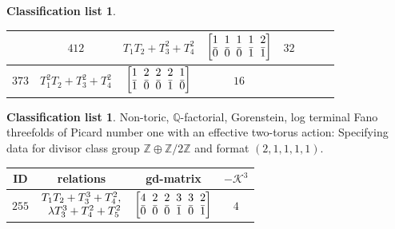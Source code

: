 \documentclass[pdftex]{sigma}%
\theoremstyle{definition}
\newtheorem{class-list}[thm]{Classification list}
\def\ZZ{{\mathbb Z}}
\def\QQ{{\mathbb Q}}
\numberwithin{equation}{section}
\begin{document}
\begin{class-list}
\begin{table}[h!]
\begin{tabu}{c|c|c|c||c|c|c|c}
&${412}$&${T_{1}T_{2}+T_{3}^{2}+T_{4}^{2}}$
&$\arraycolsep=1mm\begin{bmatrix}{1} & {1} & {1} & {1} & {2} \\ {\bar{0}} & {\bar{0}} & {\bar{0}} & {\bar{1}} & {\bar{1}}\end{bmatrix}$&${32}$
\\
\hline
${373}$&${T_{1}^{2}T_{2}+T_{3}^{2}+T_{4}^{2}}$
&$\arraycolsep=1mm\begin{bmatrix}{1} & {2} & {2} & {2} & {1} \\ {\bar{1}} & {\bar{0}} & {\bar{0}} & {\bar{1}} & {\bar{0}}\end{bmatrix}$&${16}$
\\
\end{tabu}\vspace{1mm}
\end{table}
\end{class-list}

\begin{class-list}
Non-toric, $\QQ$-factorial, Gorenstein, log terminal Fano
threefolds of Picard number one with an effective two-torus action:
Specifying data for divisor class group $\ZZ\oplus \ZZ/2\ZZ$ and
format $(2,1,1,1,1)$.
\begin{table}[h!]\centering\setlength{\tabcolsep}{5.5pt}
\renewcommand{\arraystretch}{1.25}\small\tabulinesep=1mm
\begin{tabu}{c|c|c|c}
\hline
ID&relations&gd-matrix&$-\mathcal{K}^3$
\\
\hline
${255}$&$\setlength{\arraycolsep}{1pt}\begin{array}{r}{T_{1}T_{2}+T_{3}^{3}+T_{4}^{2}},\\ {\lambda T_{3}^{3}+T_{4}^{2}+T_{5}^{2}}\end{array}$
&$\arraycolsep=1mm\begin{bmatrix}{4} & {2} & {2} & {3} & {3} & {2} \\ {\bar{0}} & {\bar{0}} & {\bar{0}} & {\bar{1}} & {\bar{0}} & {\bar{1}}\end{bmatrix}$&${4}$
\\
\hline
\end{tabu}\vspace{-2mm}
\end{table}
\end{class-list}
\end{document}
